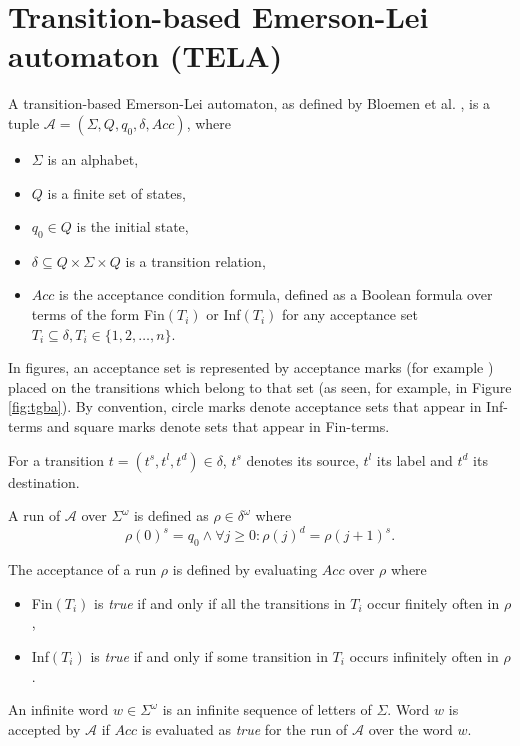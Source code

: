 \documentclass[
  digital, %
  twoside, %
  table,   %
  lof,     %
  lot,     %
]{fithesis3}
\begin{document}
\section{Transition-based Emerson-Lei automaton (TELA)} 
\label{sec:tela}
A transition-based Emerson-Lei automaton, as defined by Bloemen et al. \cite{bloemen2017}, is a tuple $\mathcal{A} = (\Sigma, Q, q_0, \delta, Acc)$, where
\begin{itemize}
  \item $\Sigma$ is an alphabet,
  \item $Q$ is a finite set of states,
  \item $q_0 \in Q$ is the initial state,
  \item $\delta \subseteq Q \times \Sigma \times Q$ is a transition relation,
  \item $Acc$ is the acceptance condition formula, defined as a Boolean formula over terms of the form Fin$(T_i)$ or Inf$(T_i)$ for any acceptance set $T_i \subseteq \delta, T_i \in \{1, 2, \dots, n\}$. 
\end{itemize}

In figures, an acceptance set is represented by acceptance marks (for example \accmarkblue) placed on the transitions which belong to that set (as seen, for example, in Figure \ref{fig:tgba}). By convention, circle marks denote acceptance sets that appear in Inf-terms and square marks denote sets that appear in Fin-terms.

For a transition $t = (t^s, t^l, t^d) \in \delta$, $t^s$ denotes its source, $t^l$ its label and $t^d$ its destination.

A run of $\mathcal{A}$ over $\Sigma^\omega$ is defined as $\rho \in \delta^\omega$ where 
\begin{equation*}
  \rho(0)^s = q_0 \wedge \forall j \geq 0 \colon \rho(j)^d = \rho(j + 1)^s.
\end{equation*}

The acceptance of a run $\rho$ is defined by evaluating $Acc$ over $\rho$ where
\begin{itemize}
  \item Fin$(T_i)$ is \emph{true} if and only if all the transitions in $T_i$ occur finitely often in $\rho$, 
  \item Inf$(T_i)$ is \emph{true} if and only if some transition in $T_i$ occurs infinitely often in $\rho$.
\end{itemize}

An infinite word $w \in \Sigma^\omega$ is an infinite sequence of letters of $\Sigma$. Word $w$ is accepted by $\mathcal{A}$ if $Acc$ is evaluated as \emph{true} for the run of $\mathcal{A}$ over the word $w$. 
\end{document}
